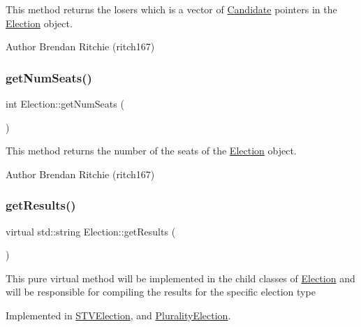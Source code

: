 This method returns the losers which is a vector of \hyperlink{classCandidate}{Candidate} pointers in the \hyperlink{classElection}{Election} object. \begin{DoxyAuthor}{Author}
Brendan Ritchie (ritch167) 
\end{DoxyAuthor}
\mbox{\label{classElection_a0b68106ee52f33286364ef5d617d77ee}} 
\subsubsection{\texorpdfstring{get\+Num\+Seats()}{getNumSeats()}}
{\footnotesize\ttfamily int Election\+::get\+Num\+Seats (\begin{DoxyParamCaption}{ }\end{DoxyParamCaption})}

This method returns the number of the seats of the \hyperlink{classElection}{Election} object. \begin{DoxyAuthor}{Author}
Brendan Ritchie (ritch167) 
\end{DoxyAuthor}
\mbox{\label{classElection_a6a6f4f301db86628b8d962281a19bf74}} 
\subsubsection{\texorpdfstring{get\+Results()}{getResults()}}
{\footnotesize\ttfamily virtual std\+::string Election\+::get\+Results (\begin{DoxyParamCaption}{ }\end{DoxyParamCaption})\hspace{0.3cm}{\ttfamily [pure virtual]}}

This pure virtual method will be implemented in the child classes of \hyperlink{classElection}{Election} and will be responsible for compiling the results for the specific election type 

Implemented in \hyperlink{classSTVElection_ae7efa73091c87add327d71ff5f943c3c}{S\+T\+V\+Election}, and \hyperlink{classPluralityElection_a60f88a34588ca87678b0f5367adf1a55}{Plurality\+Election}.

\mbox{\label{classElection_ae49e7f5d36d4afc23ed81b4df4ae658c}} 
